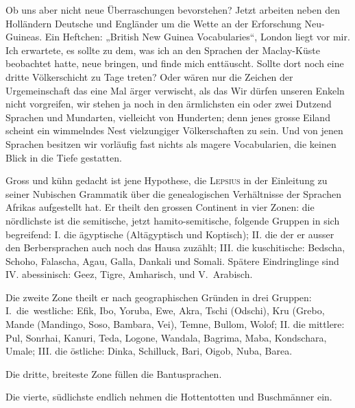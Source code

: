 {Ob uns aber nicht neue Überraschungen bevorstehen? Jetzt arbeiten neben den Holländern Deutsche und Engländer um die Wette an der Erforschung Neu-Guineas. Ein Heftchen: „British New Guinea Vocabularies“, London  liegt vor mir. Ich erwartete, es sollte zu dem, was ich an den Sprachen der Maclay-Küste beobachtet hatte, neue  bringen, und finde mich enttäuscht. Sollte dort noch eine dritte Völkerschicht zu Tage treten? Oder wären nur die Zeichen der Urgemeinschaft das eine Mal ärger verwischt, als das  Wir dürfen unseren Enkeln nicht vorgreifen, wir stehen ja noch in den ärmlichsten  ein oder zwei Dutzend Sprachen und Mundarten, vielleicht von Hunderten; denn jenes grosse Eiland scheint ein wimmelndes Nest vielzungiger Völkerschaften zu sein. Und von jenen Sprachen besitzen wir vorläufig fast nichts als magere Vocabularien, die keinen Blick in die Tiefe gestatten.

\label{sp.282}

Gross und kühn gedacht ist jene Hypothese, die \textsc{Lepsius} in der Einleitung zu seiner Nubischen Grammatik über die genealogischen Verhältnisse der Sprachen Afrikas aufgestellt hat. Er theilt den grossen Continent in vier Zonen: die nördlichste ist die semitische, jetzt hamito-semitische, folgende Gruppen in sich begreifend: I. die ägyptische (Altägyptisch und Koptisch); II. die  der er ausser den Berbersprachen auch noch das Hausa zuzählt; III. die kuschitische: Bedscha, Schoho, Falascha, Agau, Galla, Dankali und Somali. Spätere Eindringlinge sind  IV. abessinisch: Ge{\ain}ez, Tigre, Amharisch,  und \mbox{V. Arabisch}.

\largerpage[1]Die zweite Zone theilt er nach geographischen Gründen in drei Gruppen: \linebreak\mbox{I. die westliche:} Efik, Ibo, Yoruba, Ewe, Akra, Tschi (Odschi), Kru (Grebo,  Mande (Mandingo, Soso, Bambara, Vei), Temne, Bullom, Wolof; II. die mittlere: Pul, Sonrhai, Kanuri, Teda, Logone, Wandala, Bagrima, Maba, Kondschara, Umale; III. die östliche: Dinka, Schilluck,  Bari, Oigob, Nuba, Barea.

Die dritte, breiteste Zone füllen die Bantusprachen.

Die vierte, südlichste endlich nehmen die Hottentotten und Buschmänner ein.

}
